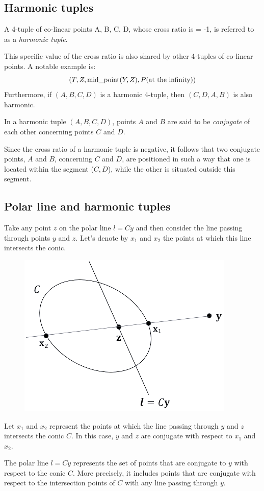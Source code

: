 \documentclass[12pt, a4paper]{report}
\begin{document}
    \subsection{Harmonic tuples}
    \begin{definition}
        A 4-tuple of co-linear points A, B, C, D, whose cross ratio is = -1, is referred to as a \emph{harmonic tuple}. 
    \end{definition}
    This specific value of the cross ratio is also shared by other 4-tuples of co-linear points. 
    A notable example is:
    \[\left( T,Z,\textnormal{mid\_point}(Y,Z),P(\textnormal{at the infinity}) \right)\]
    Furthermore, if $(A, B, C, D)$ is a harmonic 4-tuple, then $(C, D, A, B)$ is also harmonic. 
    \begin{definition}
        In a harmonic tuple $(A, B, C, D)$, points $A$ and $B$ are said to be \emph{conjugate} of each other concerning points $C$ and $D$.
    \end{definition}
    Since the cross ratio of a harmonic tuple is negative, it follows that two conjugate points, $A$ and $B$, concerning $C$ and $D$, are positioned in such a way that one is located within the segment ($C, D$), while the other is situated outside this segment.

    \subsection{Polar line and harmonic tuples}
    Take any point $z$ on the polar line $l=Cy$ and then consider the line passing through points $y$ and $z$. 
    Let's denote by $x_1$ and $x_2$ the points at which this line intersects the conic.    
    \begin{figure}[H]
        \centering
        \includegraphics[width=0.25\linewidth]{images/polarharmonic.png}
    \end{figure}
    \begin{theorem}
        Let $x_1$ and $x_2$ represent the points at which the line passing through $y$ and $z$ intersects the conic $C$. 
        In this case, $y$ and $z$ are conjugate with respect to $x_1$ and $x_2$.     
    \end{theorem}
    The polar line $l=Cy$ represents the set of points that are conjugate to $y$ with respect to the conic $C$.
    More precisely, it includes points that are conjugate with respect to the intersection points of $C$ with any line passing through $y$.
\end{document}
